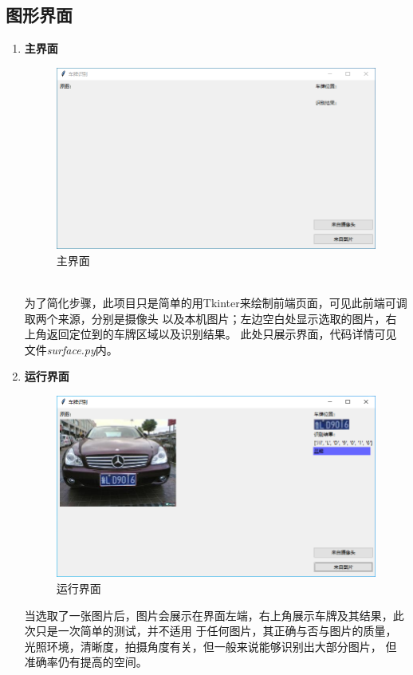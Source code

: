 \documentclass[UTF8,10pt,titlepage,a4paper]{ctexart}
\begin{document}
\subsection{图形界面}

\begin{enumerate}
  \item \textbf{主界面}\\
  \begin{figure}[h]
    \centering
    \includegraphics[width=.8\textwidth]{ui.png}
    \caption{主界面}
  \end{figure}\\
为了简化步骤，此项目只是简单的用Tkinter来绘制前端页面，可见此前端可调取两个来源，分别是摄像头
以及本机图片；左边空白处显示选取的图片，右上角返回定位到的车牌区域以及识别结果。
此处只展示界面，代码详情可见文件\emph{surface.py}内。
  \item \textbf{运行界面}\\
  \begin{figure}[h]
    \centering
    \includegraphics[width=.8\textwidth]{run.png}
    \caption{运行界面}
  \end{figure}\par
当选取了一张图片后，图片会展示在界面左端，右上角展示车牌及其结果，此次只是一次简单的测试，并不适用
于任何图片，其正确与否与图片的质量，光照环境，清晰度，拍摄角度有关，但一般来说能够识别出大部分图片，
但准确率仍有提高的空间。
\end{enumerate}
\newpage
\end{document}
